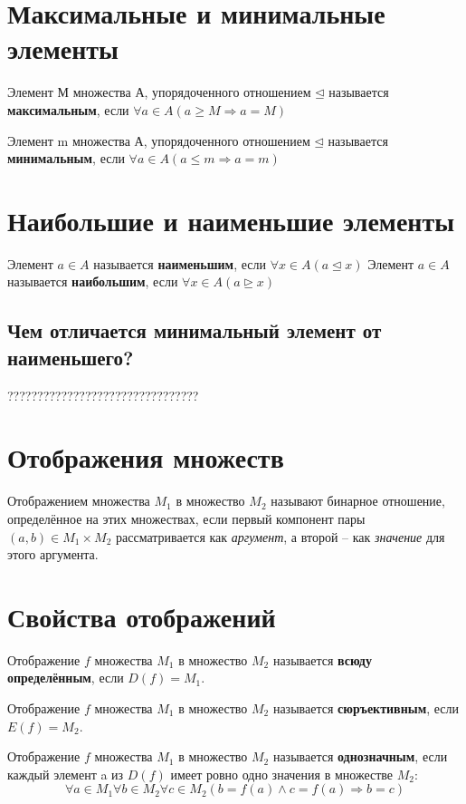 \documentclass[a4paper]{article}
\begin{document}
\section*{Максимальные и минимальные элементы}
Элемент М множества А, упорядоченного отношением $\unlhd$ называется \textbf{максимальным}, если $\forall a \in A (a \geq M \Rightarrow a = M)$

Элемент m множества А, упорядоченного отношением $\unlhd$ называется \textbf{минимальным}, если $\forall a \in A (a \leq m \Rightarrow a = m)$

\section*{Наибольшие и наименьшие элементы
}
Элемент $a \in A$ называется \textbf{наименьшим}, если $\forall x \in A (a \unlhd x)$\newline
Элемент $a \in A$ называется \textbf{наибольшим}, если $\forall x \in A (a \unrhd x)$

\subsection*{Чем отличается минимальный элемент от наименьшего?}
????????????????????????????????

\section*{Отображения множеств
}

Отображением
множества $M_1$ в множество $M_2$ называют бинарное отношение, определённое на
этих множествах, если первый компонент пары $(a, b) \in M_1 \times M_2$ рассматривается как \textit{аргумент}, а второй – как \textit{значение} для этого аргумента.

\section*{Свойства отображений}

Отображение $f$ множества $M_1$ в множество $M_2$ называется
\textbf{всюду определённым}, если $D(f) = M_1$.

Отображение $f$ множества $M_1$ в множество $M_2$ называется
\textbf{сюръективным}, если $E(f) = M_2$. 

Отображение $f$ множества $M_1$ в множество $M_2$ называется
\textbf{однозначным}, если каждый элемент a из $D(f)$ имеет ровно одно значения в множестве $M_2$:
\begin{equation}
\forall a \in M_1 \forall b \in M_2 \forall c \in M_2 (b  = f(a) \land c = f(a) \Rightarrow b = c)
\end{equation}
\end{document}
